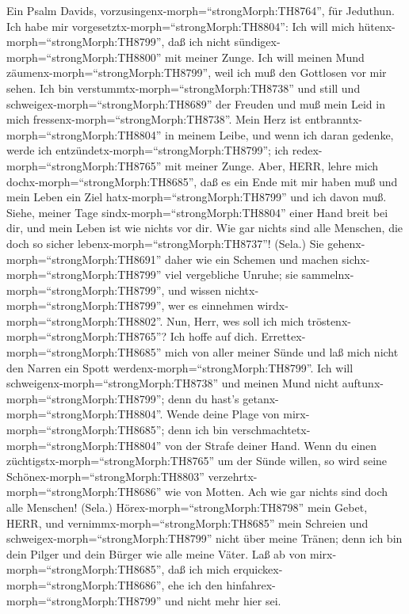  Ein Psalm Davids,
vorzusingenx-morph=``strongMorph:TH8764'', für Jeduthun. Ich habe mir
vorgesetztx-morph=``strongMorph:TH8804'': Ich will mich
hütenx-morph=``strongMorph:TH8799'', daß ich nicht
sündigex-morph=``strongMorph:TH8800'' mit meiner Zunge. Ich will meinen
Mund zäumenx-morph=``strongMorph:TH8799'', weil ich muß den Gottlosen
vor mir sehen.  Ich bin
verstummtx-morph=``strongMorph:TH8738'' und still und
schweigex-morph=``strongMorph:TH8689'' der Freuden und muß mein Leid in
mich fressenx-morph=``strongMorph:TH8738''.  Mein Herz ist
entbranntx-morph=``strongMorph:TH8804'' in meinem Leibe, und wenn ich
daran gedenke, werde ich entzündetx-morph=``strongMorph:TH8799''; ich
redex-morph=``strongMorph:TH8765'' mit meiner Zunge.  Aber,
HERR, lehre mich dochx-morph=``strongMorph:TH8685'', daß es ein Ende mit
mir haben muß und mein Leben ein Ziel hatx-morph=``strongMorph:TH8799''
und ich davon muß.  Siehe, meiner Tage
sindx-morph=``strongMorph:TH8804'' einer Hand breit bei dir, und mein
Leben ist wie nichts vor dir. Wie gar nichts sind alle Menschen, die
doch so sicher lebenx-morph=``strongMorph:TH8737''! (Sela.) 
Sie gehenx-morph=``strongMorph:TH8691'' daher wie ein Schemen und machen
sichx-morph=``strongMorph:TH8799'' viel vergebliche Unruhe; sie
sammelnx-morph=``strongMorph:TH8799'', und wissen
nichtx-morph=``strongMorph:TH8799'', wer es einnehmen
wirdx-morph=``strongMorph:TH8802''.  Nun, Herr, wes soll ich
mich tröstenx-morph=``strongMorph:TH8765''? Ich hoffe auf dich.
 Errettex-morph=``strongMorph:TH8685'' mich von aller meiner
Sünde und laß mich nicht den Narren ein Spott
werdenx-morph=``strongMorph:TH8799''.  Ich will
schweigenx-morph=``strongMorph:TH8738'' und meinen Mund nicht
auftunx-morph=``strongMorph:TH8799''; denn du hast's
getanx-morph=``strongMorph:TH8804''.  Wende deine Plage von
mirx-morph=``strongMorph:TH8685''; denn ich bin
verschmachtetx-morph=``strongMorph:TH8804'' von der Strafe deiner Hand.
 Wenn du einen züchtigstx-morph=``strongMorph:TH8765'' um
der Sünde willen, so wird seine Schönex-morph=``strongMorph:TH8803''
verzehrtx-morph=``strongMorph:TH8686'' wie von Motten. Ach wie gar
nichts sind doch alle Menschen! (Sela.) 
Hörex-morph=``strongMorph:TH8798'' mein Gebet, HERR, und
vernimmx-morph=``strongMorph:TH8685'' mein Schreien und
schweigex-morph=``strongMorph:TH8799'' nicht über meine Tränen; denn ich
bin dein Pilger und dein Bürger wie alle meine Väter.  Laß
ab von mirx-morph=``strongMorph:TH8685'', daß ich mich
erquickex-morph=``strongMorph:TH8686'', ehe ich den
hinfahrex-morph=``strongMorph:TH8799'' und nicht mehr hier sei.

